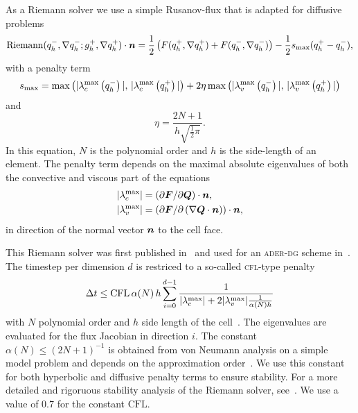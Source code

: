 As a Riemann solver we use a simple Rusanov-flux that is adapted for diffusive problems
\begin{equation}
  \label{eq:rusanov-flux}
  \operatorname{Riemann}(q_h^-, \nabla q_h^-; g_h^+, \nabla q_h^+) \cdot \bm{n} =
  \frac{1}{2} \left(
    F(q_h^+, \nabla q_h^+) +
    F(q_h^-, \nabla q_h^-)
  \right) -
  \frac{1}{2} s_\text{max} (q_h^+ - q_h^-),
\end{equation}
with a penalty term
\begin{equation}
  \label{eq:parabolic-penalty}
  s_\text{max}  = \max \left(
\maxConvEigen[q_h^-], \, \maxConvEigen[q_h^+]
\right) +
2 \eta \max \left(
\maxViscEigen[q_h^-], \, \maxViscEigen[q_h^+]
\right)
\end{equation}
and
\begin{equation}
  \eta = \frac{2N+1}{h \sqrt{\frac{1}{2} \pi}}.
\end{equation}
In this equation, $N$ is the polynomial order and $h$ is the side-length of an element.
The penalty term depends on the maximal absolute eigenvalues of both the convective and viscous part of the equations
\begin{align}
  \begin{split}
    \maxConvEigen &= \left( \partial \bm{F}/\partial \bm{Q}\right) \cdot \normal,\\
    \maxViscEigen &= \left( \partial \bm{F}/\partial \left( \nabla \bm{Q} \cdot \normal \right)\right) \cdot \normal,
  \end{split}
\end{align}
in direction of the normal vector $\bm{n}$ to the cell face. 

This Riemann solver was first published in~\cite{gassner2008discontinuous} and used for an \textsc{ader-dg} scheme in~\cite{dumbser2010arbitrary}.
The timestep per dimension $d$ is restriced to a so-called \textsc{cfl}-type penalty
\begin{equation}\label{eq:cfl-aderdg}
 \Delta t \leq  \text{CFL} \, \alpha(N) \, h \sum_{i=0}^{\dimensions-1} \frac{1}{\maxConvEigen + 2 \maxViscEigen \frac{1}{\alpha(N) h}}
\end{equation}
with $N$ polynomial order and $h$ side length of the cell~\cite{dumbser2010arbitrary,gassner2008discontinuous}.
The eigenvalues are evaluated for the flux Jacobian in direction $i$.
The constant $\alpha(N) \leq {\left( 2N+1  \right)}^{-1}$ is obtained from von Neumann analysis on a simple model problem and depends on the approximation order~\cite{dumbser2008unified}.
We use this constant for both hyperbolic and diffusive penalty terms to ensure stability.
For a more detailed and rigoruous stability analysis of the Riemann solver, see~\cite{gassner2008discontinuous}.
We use a value of $0.7$ for the constant $\text{CFL}$.

